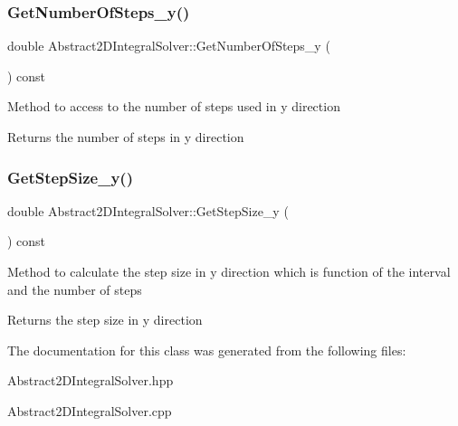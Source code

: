 \subsubsection{\texorpdfstring{Get\+Number\+Of\+Steps\+\_\+y()}{GetNumberOfSteps\_y()}}
{\footnotesize\ttfamily double Abstract2\+D\+Integral\+Solver\+::\+Get\+Number\+Of\+Steps\+\_\+y (\begin{DoxyParamCaption}{ }\end{DoxyParamCaption}) const\hspace{0.3cm}{\ttfamily [inline]}}

Method to access to the number of steps used in y direction \begin{DoxyReturn}{Returns}
the number of steps in y direction 
\end{DoxyReturn}
\mbox{\label{class_abstract2_d_integral_solver_a5c23a838a4db9b607140d4d5f03b4f79}} 
\subsubsection{\texorpdfstring{Get\+Step\+Size\+\_\+y()}{GetStepSize\_y()}}
{\footnotesize\ttfamily double Abstract2\+D\+Integral\+Solver\+::\+Get\+Step\+Size\+\_\+y (\begin{DoxyParamCaption}{ }\end{DoxyParamCaption}) const\hspace{0.3cm}{\ttfamily [inline]}}

Method to calculate the step size in y direction which is function of the interval and the number of steps \begin{DoxyReturn}{Returns}
the step size in y direction 
\end{DoxyReturn}


The documentation for this class was generated from the following files\+:\begin{DoxyCompactItemize}
\item 
Abstract2\+D\+Integral\+Solver.\+hpp\item 
Abstract2\+D\+Integral\+Solver.\+cpp\end{DoxyCompactItemize}

